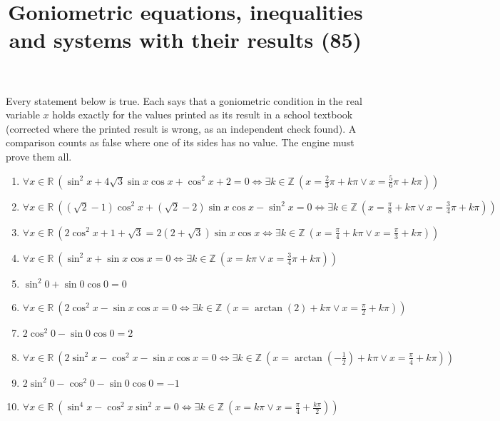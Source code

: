 \documentclass[11pt,a4paper]{article}
\title{Goniometric equations, inequalities and systems with their results (85)}
\author{}
\date{}
\begin{document}
\maketitle
Every statement below is true. Each says that a goniometric condition in the real variable $x$ holds exactly for the values printed as its result in a school textbook (corrected where the printed result is wrong, as an independent check found). A comparison counts as false where one of its sides has no value. The engine must prove them all.

\begin{enumerate}
\item $\displaystyle \forall x \in \mathbb{R}\ \left( \sin^{2} x + 4\sqrt{3}\sin x \cos x + \cos^{2} x + 2 = 0 \iff \exists k \in \mathbb{Z}\ \left( x = \frac{2}{3}\pi + k\pi \lor x = \frac{5}{6}\pi + k\pi \right) \right)$
\item $\displaystyle \forall x \in \mathbb{R}\ \left( (\sqrt{2} - 1)\cos^{2} x + (\sqrt{2} - 2)\sin x \cos x - \sin^{2} x = 0 \iff \exists k \in \mathbb{Z}\ \left( x = \frac{\pi}{8} + k\pi \lor x = \frac{3}{4}\pi + k\pi \right) \right)$
\item $\displaystyle \forall x \in \mathbb{R}\ \left( 2\cos^{2} x + 1 + \sqrt{3} = 2(2 + \sqrt{3})\sin x \cos x \iff \exists k \in \mathbb{Z}\ \left( x = \frac{\pi}{4} + k\pi \lor x = \frac{\pi}{3} + k\pi \right) \right)$
\item $\displaystyle \forall x \in \mathbb{R}\ \left( \sin^{2} x + \sin x \cos x = 0 \iff \exists k \in \mathbb{Z}\ \left( x = k\pi \lor x = \frac{3}{4}\pi + k\pi \right) \right)$
\item $\displaystyle \sin^{2} 0 + \sin 0 \cos 0 = 0$
\item $\displaystyle \forall x \in \mathbb{R}\ \left( 2\cos^{2} x - \sin x \cos x = 0 \iff \exists k \in \mathbb{Z}\ \left( x = \arctan\left(2\right) + k\pi \lor x = \frac{\pi}{2} + k\pi \right) \right)$
\item $\displaystyle 2\cos^{2} 0 - \sin 0 \cos 0 = 2$
\item $\displaystyle \forall x \in \mathbb{R}\ \left( 2\sin^{2} x - \cos^{2} x - \sin x \cos x = 0 \iff \exists k \in \mathbb{Z}\ \left( x = \arctan\left(-\frac{1}{2}\right) + k\pi \lor x = \frac{\pi}{4} + k\pi \right) \right)$
\item $\displaystyle 2\sin^{2} 0 - \cos^{2} 0 - \sin 0 \cos 0 = -1$
\item $\displaystyle \forall x \in \mathbb{R}\ \left( \sin^{4} x - \cos^{2} x \sin^{2} x = 0 \iff \exists k \in \mathbb{Z}\ \left( x = k\pi \lor x = \frac{\pi}{4} + \frac{k\pi}{2} \right) \right)$

\end{enumerate}
\end{document}
